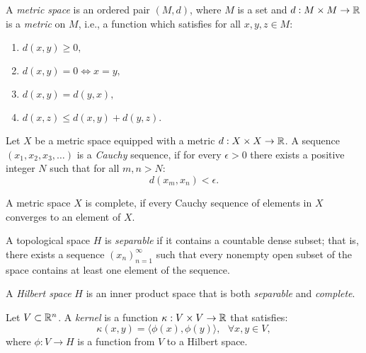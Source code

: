 \begin{definition}\label{def:notation:metric_space}
A \emph{metric space} is an ordered pair $(M,d)$, where $M$ is a set and $d: M \times M \rightarrow \mathbb{R}$ is a \emph{metric} on $M$, i.e.,
a function which satisfies for all $x,y,z \in M$:
\begin{enumerate}
\item $d(x,y) \geq 0,$
\item $d(x,y) = 0 \Longleftrightarrow x = y,$
\item $d(x,y) = d(y,x),$
\item $d(x,z) \leq d(x,y) + d(y,z).$
\end{enumerate}
\end{definition}

\begin{definition}\label{def:notation:cauchy_sequence}
Let $X$ be a metric space equipped with a metric $d: X \times X \rightarrow \mathbb{R}$. A sequence $(x_1, x_2, x_3, \ldots)$
is a \emph{Cauchy} sequence, if for every $\epsilon > 0$ there exists a positive integer $N$ such
that for all $m,n > N$:
$$ d(x_m, x_n)<\epsilon.$$
\end{definition}

\begin{definition}\label{def:notation:complete_space}
A metric space $X$ is complete, if every Cauchy sequence of elements in $X$ converges to an element of $X$.
\end{definition}

\begin{definition}\label{def:notation:separable_space}
A topological space $H$ is \emph{separable} if it contains a countable dense subset; that is, there
exists a sequence $(x_n)_{n=1}^{\infty}$ such that every nonempty open subset of the space contains at least
one element of the sequence.
\end{definition}

\begin{definition}\label{def:notation:hilbert_space}
A \emph{Hilbert space} $H$ is an inner product space that is both \emph{separable} and \emph{complete}.
\end{definition}

\begin{definition}\label{def:notation:kernel_function}
Let $V \subset \mathbb{R}^n$. A \emph{kernel} is a function $\kappa: V \times V \rightarrow \mathbb{R}$ that satisfies:
$$ \kappa(x,y) = \langle \phi(x), \phi(y) \rangle,~~~\forall x,y \in V,$$
where $\phi: V \rightarrow H$ is a function from $V$ to a Hilbert space.
\end{definition}

